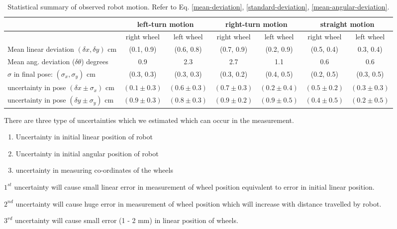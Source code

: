 \begin{table}[H]
	\centering
	\begin{tabular}{| l | c | c | c | c | c | c |}
		\hline
		& \multicolumn{2}{c|}{left-turn motion} & \multicolumn{2}{c|}{ right-turn motion} & \multicolumn{2}{c|}{straight motion} \\
		\hline
		& right wheel & left wheel & right wheel & left wheel & right wheel & left wheel \\
		\hline
		Mean linear deviation $(\delta x, \delta y)$ cm & (0.1, 0.9) & (0.6, 0.8)
		& (0.7, 0.9) & (0.2, 0.9) & (0.5, 0.4) & 0.3, 0.4) \\
		\hline
		Mean ang. deviation ($\delta \theta$) degrees & 0.9 & 2.3 & 2.7 & 1.1 & 0.6 & 0.6 \\
		\hline
		$\sigma$ in final pose: $(\sigma_x, \sigma_y)$ cm & (0.3, 0.3) & (0.3, 0.3) & (0.3, 0.2) & (0.4, 0.5) & (0.2, 0.5) & (0.3, 0.5)\\
		\hline
		uncertainty in pose $(\delta x \pm \sigma_x)$ cm & $(0.1 \pm 0.3)$ & $(0.6 \pm 0.3)$ & $(0.7 \pm 0.3)$ & $(0.2 \pm 0.4)$ & $(0.5 \pm 0.2)$ & $(0.3 \pm 0.3)$ \\
		uncertainty in pose $(\delta y \pm \sigma_y)$ cm & $(0.9 \pm 0.3)$ & $(0.8 \pm 0.3)$ & $(0.9 \pm 0.2)$ & $(0.9 \pm 0.5)$ & $(0.4 \pm 0.5)$ & $(0.2 \pm 0.5)$ \\
		\hline
	\end{tabular}
	\caption{Statistical summary of observed robot motion. Refer to Eq. \ref{mean-deviation}, \ref{standard-deviation}, \ref{mean-angular-deviation}. }
	\label{stats}
\end{table}
There are three type of uncertainties which we estimated which can occur in the measurement. 
\begin{enumerate}
	\item Uncertainty in initial linear position of robot
	\item Uncertainty in initial angular position of robot
	\item uncertainty in measuring co-ordinates of the wheels
\end{enumerate}   

$1^{st}$ uncertainty will cause small linear error in measurement of wheel position equivalent to error in initial linear position.

$2^{nd}$ uncertainty will cause huge error in measurement of wheel position which will increase with distance travelled by robot. 

$3^{rd}$ uncertainty will cause small error (1 - 2 mm) in linear position of wheels.

